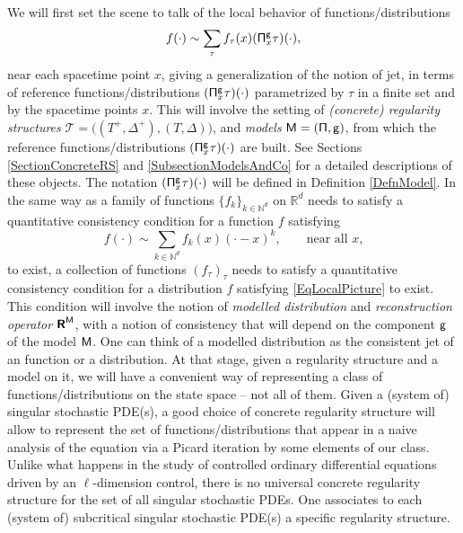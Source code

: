 \documentclass[10pt, reqno]{amsart}
\numberwithin{subsection}{section}
\numberwithin{subsubsection}{subsection}
\numberwithin{equation}{section} %
\theoremstyle{mystyle}
\theoremstyle{mystyle2}
\theoremstyle{mystyle3}
\newcommand\bbN{\mathbb{N}}
\newcommand\bbR{\mathbb{R}}
\begin{document}
 We will first set the scene to talk of the local behavior of functions/distributions
\begin{equation} \label{EqLocalPicture}
f(\cdot) \sim \sum_\tau f_\tau(x) ({\sf \Pi}^{\sf g}_x\tau)(\cdot),
\end{equation}
near each spacetime point $x$, giving a generalization of the notion of jet, in terms of reference functions/distributions $({\sf \Pi}^{\sf g}_x\tau)(\cdot)$ parametrized by $\tau$ in a finite set and by the spacetime points $x$. This will involve the setting of {\it (concrete) regularity structures} $\mathscr{T}=\big((T^+,\Delta^+),(T,\Delta)\big)$, and {\it models} $\sf M=(\Pi, g)$, from which the reference functions/distributions $({\sf \Pi}^{\sf g}_x\tau)(\cdot)$ are built. See Sections \ref{SectionConcreteRS} and \ref{SubsectionModelsAndCo} for a detailed descriptions of these objects. The notation $({\sf \Pi}^{\sf g}_x\tau)(\cdot)$ will be defined in Definition \ref{DefnModel}. In the same way as a family of functions $\{f_k\}_{k\in\bbN^d}$ on $\bbR^d$ needs to satisfy a quantitative consistency condition for a function $f$ satisfying
$$
f(\cdot) \sim \sum_{k\in\bbN^d} f_k(x) (\cdot-x)^k, \qquad \textrm{near all $x$,}
$$
to exist, a collection of functions $(f_\tau)_\tau$ needs to satisfy a quantitative consistency condition for a distribution $f$ satisfying \eqref{EqLocalPicture} to exist. This condition will involve the notion of {\it modelled distribution} and {\it reconstruction operator} $\textbf{\textsf{R}}^{\sf M}$, with a notion of consistency that will depend on the component $\sf g$ of the model $\sf M$. One can think of a modelled distribution as the consistent jet of an function or a distribution. At that stage, given a regularity structure and a model on it, we will have a convenient way of representing a class of functions/distributions on the state space -- not all of them. Given a (system of) singular stochastic PDE(s), a good choice of concrete regularity structure will allow to represent the set of functions/distributions that appear in a naive analysis of the equation via a Picard iteration by some elements of our class. Unlike what happens in the study of controlled ordinary differential equations driven by an $\ell$-dimension control, there is no universal concrete regularity structure for the set of all singular stochastic PDEs. One associates to each (system of) subcritical singular stochastic PDE(s) a specific regularity structure. 
\end{document}
